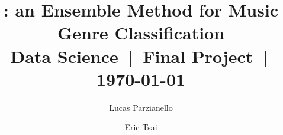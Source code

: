 \title[\name -- Ensemble Music Genre Classification]{\name: an Ensemble Method for Music Genre Classification\\{\sc\small Data Science $~|~$ Final Project $~|~$ \today}}

\setreviewson


\author{Lucas Parzianello}


\author{Eric Tsai}

\renewcommand{\shortauthors}{Parzianello and Tsai}



